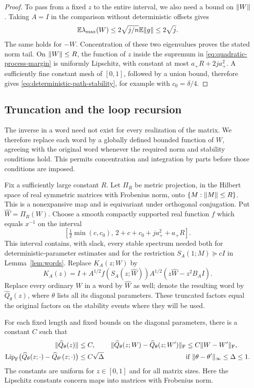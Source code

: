 \begin{proof}
To pass from a fixed $z$ to the entire interval, we also need a
bound on $\lVert W\rVert$.  Taking $A=I$ in the comparison without
deterministic offsets gives
\[
 \mathbb E\lambda_{\max}(W)\le2\sqrt{j/n}\mathbb E\lVert g\rVert\le2\sqrt j.
\]
The same holds for $-W$.  Concentration of these two eigenvalues
proves the stated norm tail.  On $\lVert W\rVert\le R$, the function of
$z$ inside the supremum in \eqref{eq:quadratic-process-margin} is
uniformly Lipschitz, with constant at most $a_+R+2ja_+^2$.
A sufficiently fine constant mesh of $[0,1]$, followed by a union
bound, therefore gives \eqref{eq:deterministic-path-stability}, for
example with $c_0=\delta/4$.
\end{proof}

\subsection{Truncation and the loop recursion}

The inverse in a word need not exist for every realization of the
matrix.  We therefore replace each word by a globally defined
bounded function of $W$, agreeing with the original word whenever
the required norm and stability conditions hold.  This permits
concentration and integration by parts before those conditions
are imposed.

Fix a sufficiently large constant $R$.  Let $\Pi_R$ be metric
projection, in the Hilbert space of real symmetric matrices with
Frobenius norm, onto $\{M:\lVert M\rVert\le R\}$.  This is a nonexpansive
map and is equivariant under orthogonal conjugation.  Put
$\widehat W=\Pi_R(W)$.  Choose a smooth compactly supported real
function $f$ which equals $x^{-1}$ on the interval
\[
 \left[\tfrac12\min(c,c_0),\,2+c+c_0+ja_+^2+a_+R\right].
\]
This interval contains, with slack, every stable spectrum needed
both for deterministic-parameter estimates and for the restriction
$S_A(1;M)\succeq cI$ in Lemma~\ref{lem:words}.  Replace $K_A(z;W)$
by
\begin{equation}\label{eq:truncated-K}
 \widehat K_A(z)
 =I+A^{1/2}f(S_A(z;\widehat W))A^{1/2}
       (z\widehat W-z^2B_AI).
\end{equation}
Replace every ordinary $W$ in a word by $\widehat W$ as well; denote
the resulting word by $\widehat Q_\theta(z)$, where $\theta$ lists
all its diagonal parameters.  These truncated factors equal the
original factors on the stability events where they will be used.

For each fixed length and fixed bounds on the diagonal parameters,
there is a constant $C$ such that
\begin{align}
 \lVert \widehat Q_\theta(z)\rVert&\le C,
 &\lVert \widehat Q_\theta(z;W)-\widehat Q_\theta(z;W')\rVert_{\mathrm F}
 &\le C\lVert W-W'\rVert_{\mathrm F},
 \label{eq:truncated-word-lipschitz}\\
 \operatorname{Lip}_{\mathrm F}\bigl(\widehat Q_\theta(z;\cdot)
                   -\widehat Q_{\theta'}(z;\cdot)\bigr)
 &\le C\sqrt\Delta
 &&\text{if }\lVert \theta-\theta'\rVert_\infty\le\Delta\le1.
 \label{eq:truncated-word-increment-lipschitz}
\end{align}
The constants are uniform for $z\in[0,1]$ and for all matrix sizes.
Here the Lipschitz constants concern maps into matrices with
Frobenius norm.

